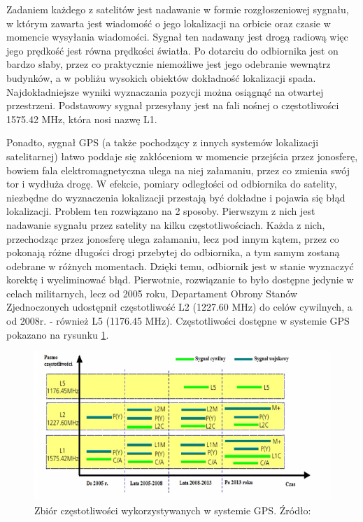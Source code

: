 Zadaniem każdego z satelitów jest nadawanie w formie rozgłoszeniowej sygnału, w którym zawarta jest wiadomość o jego lokalizacji na orbicie oraz czasie w momencie wysyłania wiadomości. Sygnał ten nadawany jest drogą radiową więc jego prędkość jest równa prędkości światła. Po dotarciu do odbiornika jest on bardzo słaby, przez co praktycznie niemożliwe jest jego odebranie wewnątrz budynków, a w pobliżu wysokich obiektów dokładność lokalizacji spada. Najdokładniejsze wyniki wyznaczania pozycji można osiągnąć na otwartej przestrzeni. Podstawowy sygnał przesyłany jest na fali nośnej o częstotliwości 1575.42 MHz, która nosi nazwę L1.

Ponadto, sygnał GPS (a także pochodzący z innych systemów lokalizacji satelitarnej)  łatwo poddaje się zakłóceniom w momencie przejścia przez jonosferę, bowiem fala elektromagnetyczna ulega na niej załamaniu, przez co zmienia swój tor i wydłuża drogę. W efekcie, pomiary odległości od odbiornika do satelity, niezbędne do wyznaczenia lokalizacji przestają być dokładne i pojawia się błąd lokalizacji.
Problem ten rozwiązano na 2 sposoby. Pierwszym z nich jest nadawanie sygnału przez satelity na kilku częstotliwościach. Każda z nich, przechodząc przez jonosferę ulega załamaniu, lecz pod innym kątem, przez co pokonają różne długości drogi przebytej do odbiornika, a tym samym zostaną odebrane w różnych momentach. Dzięki temu, odbiornik jest w stanie wyznaczyć korektę i wyeliminować błąd. Pierwotnie, rozwiązanie to było dostępne jedynie w celach militarnych, lecz od 2005 roku, Departament Obrony Stanów Zjednoczonych udostępnił częstotliwość L2 (1227.60 MHz) do celów cywilnych, a od 2008r. - również L5 (1176.45 MHz). Częstotliwości dostępne w systemie GPS pokazano na rysunku \ref{fig:image_gps_frequencies}.

\begin{figure}[H]
	\centering
	\includegraphics[width=15cm]{img/theory/GPS/gps_frequencies.png}
	\caption{Zbiór częstotliwości wykorzystywanych w systemie GPS. Źródło: \cite{inzynierka}}
	\label{fig:image_gps_frequencies}
\end{figure}

